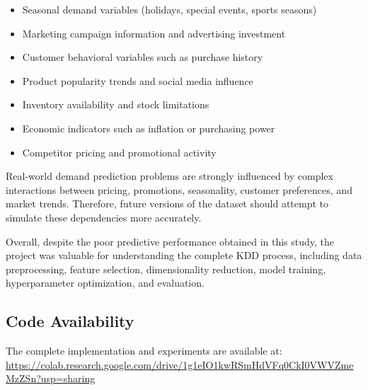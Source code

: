 \documentclass[12pt]{article}
\begin{document}
\begin{itemize}
    \item Seasonal demand variables (holidays, special events, sports seasons)
    \item Marketing campaign information and advertising investment
    \item Customer behavioral variables such as purchase history
    \item Product popularity trends and social media influence
    \item Inventory availability and stock limitations
    \item Economic indicators such as inflation or purchasing power
    \item Competitor pricing and promotional activity
\end{itemize}

Real-world demand prediction problems are strongly influenced by complex interactions between pricing, promotions, seasonality, customer preferences, and market trends. Therefore, future versions of the dataset should attempt to simulate these dependencies more accurately.

Overall, despite the poor predictive performance obtained in this study, the project was valuable for understanding the complete KDD process, including data preprocessing, feature selection, dimensionality reduction, model training, hyperparameter optimization, and evaluation.


\subsection*{Code Availability}
The complete implementation and experiments are available at:
\url{https://colab.research.google.com/drive/1g1eIO1kwRSmHdVFq0CkI0VWVZmeMzZSn?usp=sharing}




\end{document}
